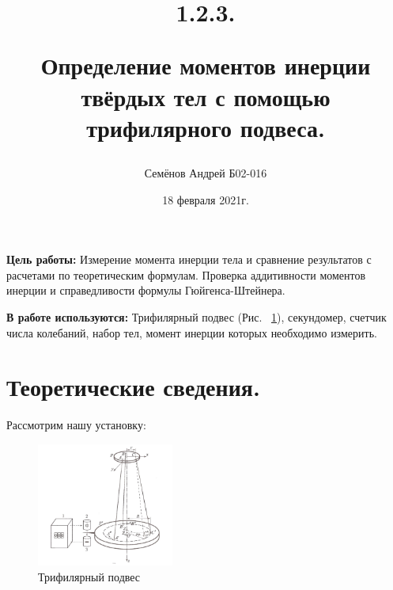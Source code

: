 \documentclass[12pt,a4paper]{article}
\begin{document}
\title{
1.2.3.

Определение моментов инерции твёрдых тел с помощью трифилярного подвеса.
\author{Семёнов Андрей Б02-016}
}
\date{18 февраля 2021г.}

\maketitle

\newpage

\textbf{Цель работы:} Измерение момента инерции тела и сравнение результатов с расчетами по теоретическим формулам. Проверка аддитивности моментов инерции и справедливости формулы Гюйгенса-Штейнера.

		
\textbf{В работе используются:} Трифилярный подвес (Рис. ~\ref{ris:trifilar}), секундомер, счетчик числа колебаний, набор тел, момент инерции которых необходимо измерить.

\section{Теоретические сведения.}
	
	Рассмотрим нашу установку:\\
	\begin{figure}
   		\includegraphics[width=0.4\textwidth]{123.jpg}
    	\caption{Трифилярный подвес}
    	\label{ris:trifilar}
	\end{figure}
	
\end{document}
